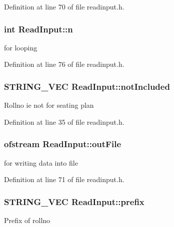 \-Definition at line 70 of file readinput.\-h.

\hypertarget{classReadInput_a00428413f6f29154a5d1170c768bbe35}{
\subsubsection[{n}]{\setlength{\rightskip}{0pt plus 5cm}int {\bf \-Read\-Input\-::n}}}\label{de/d50/classReadInput_a00428413f6f29154a5d1170c768bbe35}
for looping 

\-Definition at line 76 of file readinput.\-h.

\hypertarget{classReadInput_a4b4854ad4dd83b96d6c38d1f0b8d5417}{
\subsubsection[{not\-Included}]{\setlength{\rightskip}{0pt plus 5cm}\-S\-T\-R\-I\-N\-G\-\_\-\-V\-E\-C {\bf \-Read\-Input\-::not\-Included}}}\label{de/d50/classReadInput_a4b4854ad4dd83b96d6c38d1f0b8d5417}
\-Rollno ie not for seating plan 

\-Definition at line 35 of file readinput.\-h.

\hypertarget{classReadInput_af50237ba8a8e8e4a9e4ccc7926215937}{
\subsubsection[{out\-File}]{\setlength{\rightskip}{0pt plus 5cm}ofstream {\bf \-Read\-Input\-::out\-File}}}\label{de/d50/classReadInput_af50237ba8a8e8e4a9e4ccc7926215937}
for writing data into file 

\-Definition at line 71 of file readinput.\-h.

\hypertarget{classReadInput_a6a96c934f8c9a2a2056dc50505017e52}{
\subsubsection[{prefix}]{\setlength{\rightskip}{0pt plus 5cm}\-S\-T\-R\-I\-N\-G\-\_\-\-V\-E\-C {\bf \-Read\-Input\-::prefix}}}\label{de/d50/classReadInput_a6a96c934f8c9a2a2056dc50505017e52}
\-Prefix of rollno 

